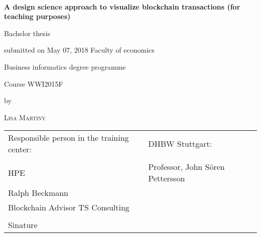 \newcommand{\typMeinerArbeit}{Bachelor thesis} 

\newcommand{\themaMeinerArbeit}{A design science approach to visualize blockchain transactions (for teaching purposes)}

\thispagestyle{empty}

\begin{spacing}{1}
\begin{center}	
~\vspace{0mm}

{\sffamily
\LARGE  
\textbf{A design science approach to visualize blockchain transactions (for teaching purposes)}

}


\vspace{15mm}

{\Large \typMeinerArbeit}

\vspace{1cm}

submitted on May 07, 2018
\vspace{15mm}
Faculty of economics
\medskip

Business informatics degree programme
\medskip

Course WWI2015F

\vspace{10mm}

by

\vspace{10mm}

{\large\textsc{Lisa Martiny}}

\vspace{10mm}
\end{center}

\vfill

\begin{tabular}{ll}
Responsible person in the training center: & DHBW Stuttgart: \\
\hspace{0.4\linewidth} & \\
HPE & Professor, John Sören Pettersson \\
Ralph Beckmann  &  \\
Blockchain Advisor TS Consulting \\
\\
Sinature \\
\end{tabular}


\vspace{1cm}
\end{spacing}

